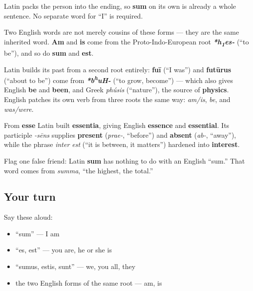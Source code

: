 Latin packs the person into the ending, so \textbf{sum} on its own is already a whole sentence. No separate word for \textquotedblleft{}I\textquotedblright{} is required.

\begin{cousinweb}
Two English words are not merely cousins of these forms — they are the same inherited word. \textbf{Am} and \textbf{is} come from the Proto-Indo-European root \emph{\textbf{*h\textsubscript{1}es-}} (\textquotedblleft{}to be\textquotedblright{}), and so do \textbf{sum} and \textbf{est}.

Latin builds its past from a second root entirely: \textbf{fuī} (\textquotedblleft{}I was\textquotedblright{}) and \textbf{futūrus} (\textquotedblleft{}about to be\textquotedblright{}) come from \emph{\textbf{*b\textsuperscript{h}uH-}} (\textquotedblleft{}to grow, become\textquotedblright{}) — which also gives English \textbf{be} and \textbf{been}, and Greek \emph{phúsis} (\textquotedblleft{}nature\textquotedblright{}), the source of \textbf{physics}. English patches its own verb from three roots the same way: \emph{am/is}, \emph{be}, and \emph{was/were}.

From \textbf{esse} Latin built \textbf{essentia}, giving English \textbf{essence} and \textbf{essential}. Its participle \emph{-sēns} supplies \textbf{present} (\emph{prae-}, \textquotedblleft{}before\textquotedblright{}) and \textbf{absent} (\emph{ab-}, \textquotedblleft{}away\textquotedblright{}), while the phrase \emph{inter est} (\textquotedblleft{}it is between, it matters\textquotedblright{}) hardened into \textbf{interest}.

Flag one false friend: Latin \textbf{sum} has nothing to do with an English \textquotedblleft{}sum.\textquotedblright{} That word comes from \emph{summa}, \textquotedblleft{}the highest, the total.\textquotedblright{}
\end{cousinweb}

\subsection*{Your turn}
Say these aloud:

\begin{itemize}
\raggedright
  \item \textquotedblleft{}sum\textquotedblright{} — I am
  \item \textquotedblleft{}es, est\textquotedblright{} — you are, he or she is
  \item \textquotedblleft{}sumus, estis, sunt\textquotedblright{} — we, you all, they
  \item the two English forms of the same root — am, is
\end{itemize}

